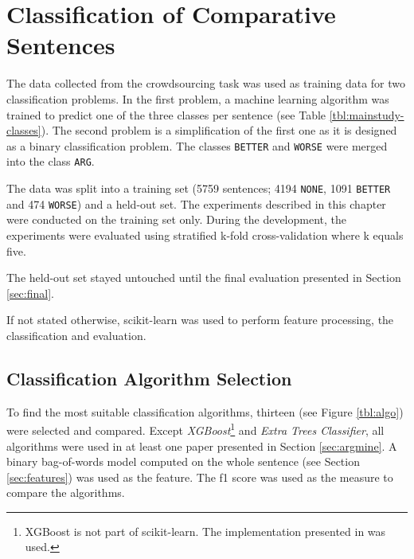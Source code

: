 \chapter{Classification of Comparative Sentences}
\label{chp:class}
The data collected from the crowdsourcing task was used as training data for two classification problems. In the first problem, a machine learning algorithm was trained to predict one of the three classes per sentence (see Table \ref{tbl:mainstudy-classes}). The second problem is a simplification of the first one as it is designed as a binary classification problem. The classes \texttt{BETTER} and \texttt{WORSE} were merged into the class \texttt{ARG}.

The data was split into a training set (5759 sentences; 4194 \texttt{NONE}, 1091 \texttt{BETTER} and 474 \texttt{WORSE}) and a held-out set.
The experiments described in this chapter were conducted on the training set only. During the development, the experiments were evaluated using stratified k-fold cross-validation where k equals five. 

The held-out set stayed untouched until the final evaluation presented in Section \ref{sec:final}.

If not stated otherwise, scikit-learn \cite{scikit-learn} was used to perform feature processing, the classification and evaluation.

\section{Classification Algorithm Selection}


To find the most suitable classification algorithms, thirteen (see Figure \ref{tbl:algo}) were selected and compared. Except \emph{XGBoost}\footnote{XGBoost is not part of scikit-learn. The implementation presented in \cite{DBLP:journals/corr/ChenG16} was used.} and \emph{Extra Trees Classifier}, all algorithms were used in at least one paper presented in Section \ref{sec:argmine}. A binary bag-of-words model computed on the whole sentence (see Section \ref{sec:features}) was used as the feature. The f1 score was used as the measure to compare the algorithms. 

